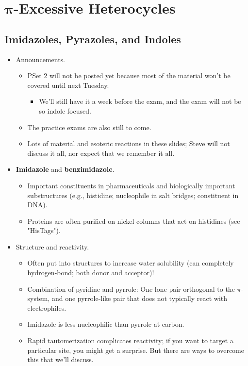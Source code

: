 \documentclass[../notes.tex]{subfiles}
\begin{document}
\chapter{\texorpdfstring{$\bm{\pi}$}{TEXT}-Excessive Heterocycles}
\section{Imidazoles, Pyrazoles, and Indoles}
\begin{itemize}
    \item {}Announcements.
    \begin{itemize}
        \item PSet 2 will not be posted yet because most of the material won't be covered until next Tuesday.
        \begin{itemize}
            \item We'll still have it a week before the exam, and the exam will not be so indole focused.
        \end{itemize}
        \item The practice exams are also still to come.
        \item Lots of material and esoteric reactions in these slides; Steve will not discuss it all, nor expect that we remember it all.
    \end{itemize}
    \item \textbf{Imidazole} and \textbf{benzimidazole}.
    \begin{itemize}
        \item Important constituents in pharmaceuticals and biologically important substructures (e.g., histidine; nucleophile in salt bridges; constituent in DNA).
        \item Proteins are often purified on nickel columns that act on histidines (see "HisTags").
    \end{itemize}
    \item Structure and reactivity.
    \begin{itemize}
        \item Often put into structures to increase water solubility (can completely hydrogen-bond; both donor and acceptor)!
        \item Combination of pyridine and pyrrole: One lone pair orthogonal to the $\pi$-system, and one pyrrole-like pair that does not typically react with electrophiles.
        \item Imidazole is less nucleophilic than pyrrole at carbon.
        \item Rapid tautomerization complicates reactivity; if you want to target a particular site, you might get a surprise. But there are ways to overcome this that we'll discuss.

\end{itemize}
\end{itemize}
\end{document}
